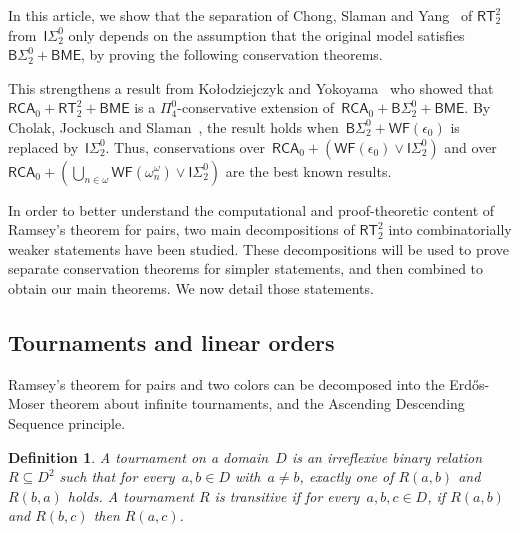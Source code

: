 \documentclass{article}
\numberwithin{theorem}{section}
\newtheorem{maintheorem}[theorem]{Main Theorem}
\newtheorem{definition}[theorem]{Definition}
\newcommand{\RCA}{\mathsf{RCA}}
\newcommand{\WKL}{\mathsf{WKL}}
\newcommand{\BSig}{\mathsf{B}\Sigma^0}
\newcommand{\ISig}{\mathsf{I}\Sigma^0}
\newcommand{\WF}{\mathsf{WF}}
\newcommand{\RT}{\mathsf{RT}}
\newcommand{\BME}{\mathsf{BME}}
\begin{document}
In this article, we show that the separation of Chong, Slaman and Yang~\cite{chong2017inductive} of $\RT^2_2$ from~$\ISig_2$ only depends on the assumption that the original model satisfies $\BSig_2 + \BME$, by proving the following conservation theorems.




This strengthens a result from Ko{\l}odziejczyk and Yokoyama~\cite{kolo2021search} who showed that $\RCA_0 + \RT^2_2 + \BME$ is a $\Pi^0_4$-conservative extension of~$\RCA_0 + \BSig_2 + \BME$.
By Cholak, Jockusch and Slaman~\cite{cholak_jockusch_slaman_2001}, the result holds when~$\BSig_2 + \WF(\epsilon_0)$ is replaced by~$\ISig_2$. Thus, conservations over~$\RCA_0 + (\WF(\epsilon_0) \vee \ISig_2)$ and over~$\RCA_0 + (\bigcup_{n \in \omega}\WF(\omega^\omega_n) \vee \ISig_2)$ are the best known results.

In order to better understand the computational and proof-theoretic content of Ramsey's theorem for pairs, two main decompositions of $\RT^2_2$ into combinatorially weaker statements have been studied. These decompositions will be used to prove separate conservation theorems for simpler statements, and then combined to obtain our main theorems. We now detail those statements.

\subsection{Tournaments and linear orders}

Ramsey's theorem for pairs and two colors can be decomposed into the Erd\H{o}s-Moser theorem about infinite tournaments, and the Ascending Descending Sequence principle.

\begin{definition}
A \emph{tournament} on a domain~$D$ is an irreflexive binary relation $R \subseteq D^2$ such that for every~$a, b \in D$ with~$a \neq b$, exactly one of $R(a, b)$ and $R(b, a)$ holds. A tournament $R$ is \emph{transitive} if for every~$a, b, c \in D$, if $R(a, b)$ and $R(b, c)$ then $R(a, c)$.
\end{definition}
\end{document}
